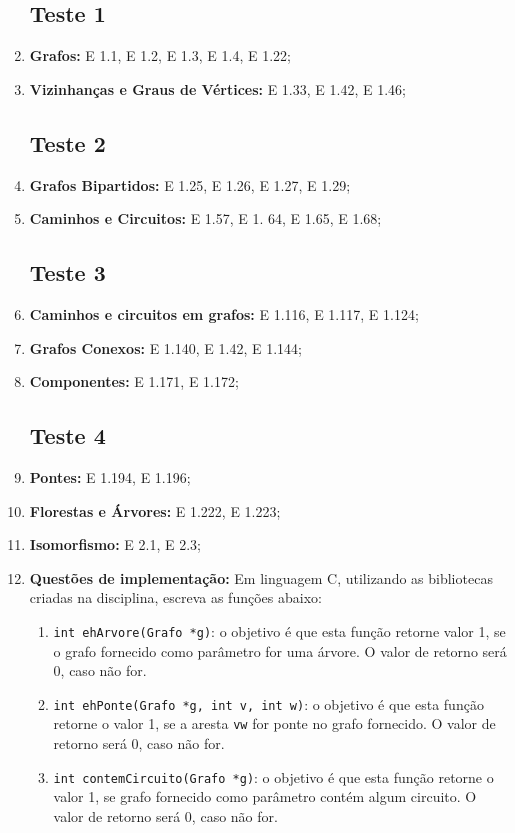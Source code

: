 \documentclass[12pt,a4paper,oneside]{article}
\begin{document}
\begin{enumerate}

	\subsection{Teste 1}
	\item[] {\bf Grafos:} E 1.1, E 1.2, E 1.3, E 1.4, E 1.22;
	\item[] {\bf Vizinhanças e Graus de Vértices:} E 1.33, E 1.42, E 1.46;
	\subsection{Teste 2}
	\item[] {\bf Grafos Bipartidos:} E 1.25, E 1.26, E 1.27, E 1.29;
	\item[] {\bf Caminhos e Circuitos:} E 1.57,	E 1. 64, E 1.65,	E 1.68;
	\subsection{Teste 3}
	\item[] {\bf Caminhos e circuitos em grafos:} E 1.116,	E 1.117, E 1.124;
	\item[] {\bf Grafos Conexos:} E 1.140, E 1.42, E 1.144;
	\item[] {\bf Componentes:} E 1.171, E 1.172;
	
	\subsection{Teste 4}
	\item[] {\bf Pontes:} E 1.194, E 1.196;
	\item[] {\bf Florestas e Árvores:} E 1.222, E 1.223;
	\item[] {\bf Isomorfismo:} E 2.1, E 2.3;
	\item[] {\bf Questões de implementação:} Em linguagem C, utilizando as bibliotecas criadas na disciplina, escreva as funções abaixo:
	\begin{enumerate}
		\item {\tt int ehArvore(Grafo *g)}: o objetivo é que esta função retorne valor 1, se o grafo fornecido como parâmetro for uma árvore. O valor de retorno será 0, caso não for.
		\item {\tt int ehPonte(Grafo *g, int v, int w)}: o objetivo é que esta função retorne o valor 1, se a aresta {\tt vw} for ponte no grafo fornecido. O valor de retorno será 0, caso não for.
		\item {\tt int contemCircuito(Grafo *g)}: o objetivo é que esta função retorne o valor 1, se grafo fornecido como parâmetro contém algum circuito. O valor de retorno será 0, caso não for.
	\end{enumerate}
    

\end{enumerate}
\end{document}
